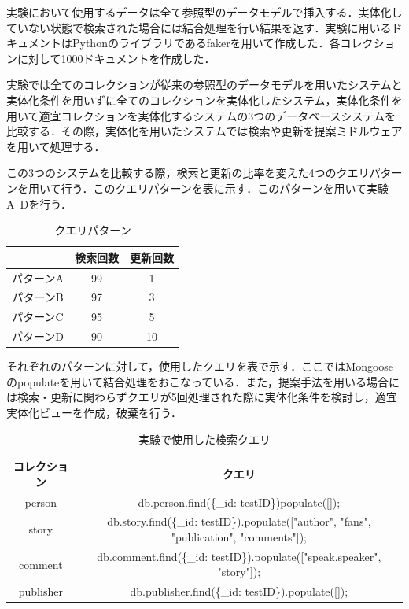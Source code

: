 \documentclass[a4paper,11pt]{ujreport}
\begin{document}
実験において使用するデータは全て参照型のデータモデルで挿入する．実体化していない状態で検索された場合には結合処理を行い結果を返す．実験に用いるドキュメントはPythonのライブラリであるfaker\cite{faker}を用いて作成した．各コレクションに対して1000ドキュメントを作成した．


実験では全てのコレクションが従来の参照型のデータモデルを用いたシステムと実体化条件を用いずに全てのコレクションを実体化したシステム，実体化条件を用いて適宜コレクションを実体化するシステムの3つのデータベースシステムを比較する．その際，実体化を用いたシステムでは検索や更新を提案ミドルウェアを用いて処理する．

この3つのシステムを比較する際，検索と更新の比率を変えた4つのクエリパターンを用いて行う．このクエリパターンを表に示す．このパターンを用いて実験A~Dを行う．
\begin{table}[htb]
  \begin{center}
    \caption{クエリパターン}
		\label{table:experiment_query_pattern}
    \begin{tabular}{|c|c|c|} \hline
        & 検索回数 & 更新回数 \\ \hline
      パターンA & 99 & 1\\ \hline
      パターンB & 97 & 3\\ \hline
			パターンC & 95 & 5\\ \hline
      パターンD & 90 & 10\\ \hline
    \end{tabular}
  \end{center}
\end{table}
それぞれのパターンに対して，使用したクエリを表で示す．ここではMongooseのpopulateを用いて結合処理をおこなっている．また，提案手法を用いる場合には検索・更新に関わらずクエリが5回処理された際に実体化条件を検討し，適宜実体化ビューを作成，破棄を行う．
\begin{table}[htb]
  \begin{center}
    \caption{実験で使用した検索クエリ}
		\label{table:ExperimentFindQuery}
    \begin{tabular}{|c|c|} \hline
      コレクション & クエリ\\ \hline
      person & db.person.find(\{\_id: testID\})populate([]);\\ \hline
			story & db.story.find(\{\_id: testID\}).populate(["author", "fans", "publication", "comments"]);\\ \hline
      comment & db.comment.find(\{\_id: testID\}).populate(["speak.speaker", "story"]);\\ \hline
      publisher & db.publisher.find(\{\_id: testID\}).populate([]);\\ \hline
    \end{tabular}
  \end{center}
\end{table}
\end{document}
